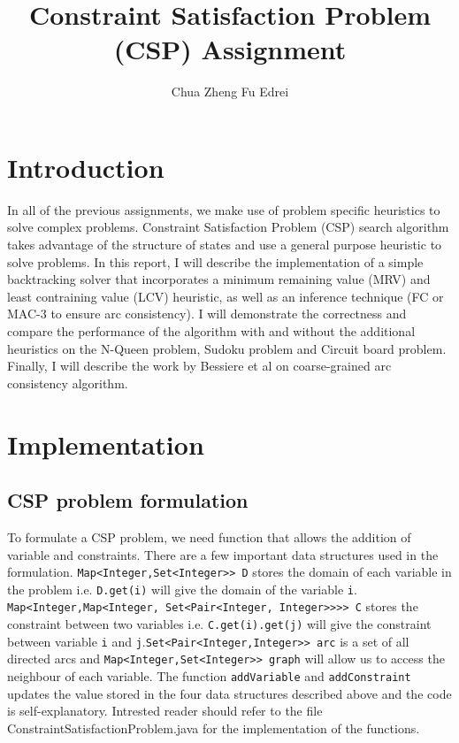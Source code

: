 \documentclass[9.5pt]{extarticle}
\title{Constraint Satisfaction Problem (CSP) Assignment}
\author{Chua Zheng Fu Edrei}
\begin{document}
\maketitle

\section{Introduction}

In all of the previous assignments, we make use of problem specific heuristics to solve complex problems. Constraint Satisfaction Problem (CSP) search algorithm takes advantage of the structure of states and use a general purpose heuristic to solve problems. In this report, I will describe the implementation of a simple backtracking solver that incorporates a minimum remaining value (MRV) and least contraining value (LCV) heuristic, as well as an inference technique (FC or MAC-3 to ensure arc consistency). I will demonstrate the correctness and compare the performance of the algorithm with and without the additional heuristics on the N-Queen problem, Sudoku problem and Circuit board problem. Finally, I will describe the work by Bessiere et al on coarse-grained arc consistency algorithm.

\section{Implementation}
\subsection{CSP problem formulation}

To formulate a CSP problem, we need function that allows the addition of variable and constraints. There are a few important data structures used in the formulation. \verb`Map<Integer,Set<Integer>> D` stores the domain of each variable in the problem i.e. \verb`D.get(i)` will give the domain of the variable \verb`i`.\\
\verb`Map<Integer,Map<Integer, Set<Pair<Integer, Integer>>>> C` stores the constraint between two variables i.e. \verb`C.get(i).get(j)` will give the constraint between variable \verb`i` and \verb`j`.\verb`Set<Pair<Integer,Integer>> arc` is a set of all directed arcs and \verb`Map<Integer,Set<Integer>> graph` will allow us to access the neighbour of each variable. The function \verb`addVariable` and \verb`addConstraint` updates the value stored in the four data structures described above and the code is self-explanatory. Intrested reader should refer to the file ConstraintSatisfactionProblem.java for the implementation of the functions.
\end{document}
